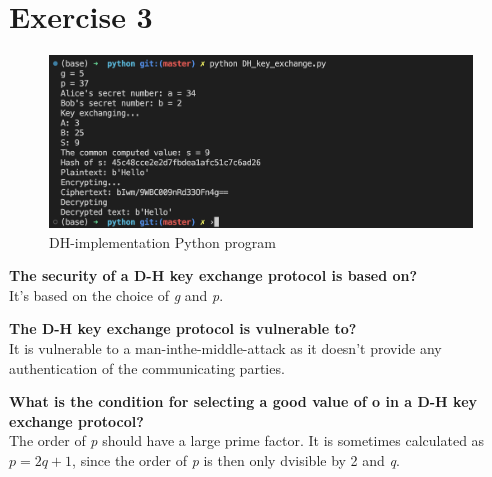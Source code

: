 \documentclass{article}
\begin{document}
\section*{Exercise 3}
%
\begin{figure}
    \centering
    \includegraphics[width=\textwidth, height=\textheight, keepaspectratio]{DH_implementation.png}
    \caption{DH-implementation Python program}
\end{figure}

\textbf{The security of a D-H key exchange protocol is based on?}\\
It's based on the choice of \emph{g} and \emph{p}.

\textbf{The D-H key exchange protocol is vulnerable to?}\\
It is vulnerable to a man-inthe-middle-attack as it doesn't provide
any authentication of the communicating parties.

\textbf{What is the condition for selecting a good value of o in a D-H key exchange protocol?}\\
The order of \emph{p} should have a large prime factor. It is sometimes
calculated as \(p = 2q + 1\), since the order of \emph{p} is then only dvisible
by 2 and \emph{q}.
\end{document}
